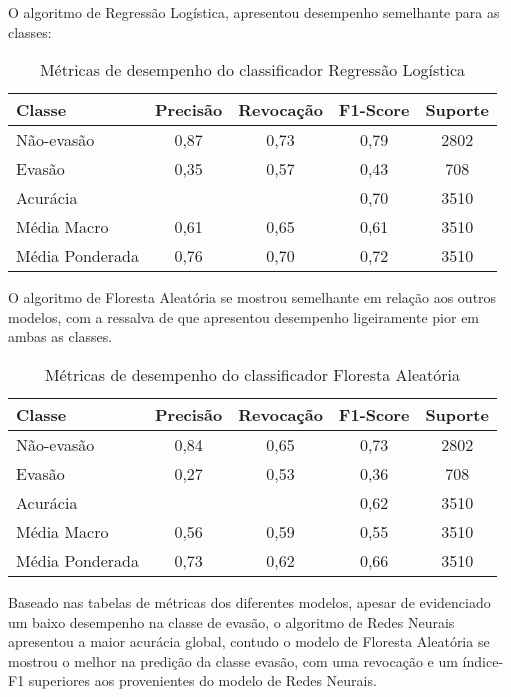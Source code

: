 \documentclass[english, spanish, brazilian]{RBIEarticle} %
\begin{document}
O algoritmo de Regressão Logística, apresentou desempenho semelhante para as classes:

\vspace{0.5cm}
\begin{table}[htbp]
\centering
\label{tab:metricas}
\begin{tabular}{lcccc}
\hline
Classe        & Precisão & Revocação & F1-Score & Suporte \\ \hline
Não-evasão           & 0,87     & 0,73      & 0,79     & 2802    \\
Evasão           & 0,35     & 0,57      & 0,43     & 708     \\ \hline
Acurácia      &          &           & 0,70     & 3510    \\
Média Macro   & 0,61     & 0,65      & 0,61     & 3510    \\
Média Ponderada & 0,76   & 0,70      & 0,72     & 3510    \\ \hline
\end{tabular}
\caption{Métricas de desempenho do classificador Regressão Logística}
\end{table}
\vspace{0.5cm}

O algoritmo de Floresta Aleatória se mostrou semelhante em relação aos outros modelos, com a ressalva de que apresentou desempenho ligeiramente pior em ambas as classes.

\vspace{0.5cm}
\begin{table}[htbp]
\centering
\label{tab:metricas2}
\begin{tabular}{lcccc}
\hline
Classe        & Precisão & Revocação & F1-Score & Suporte \\ \hline
Não-evasão           & 0,84     & 0,65      & 0,73     & 2802    \\
Evasão           & 0,27     & 0,53      & 0,36     & 708     \\ \hline
Acurácia      &          &           & 0,62     & 3510    \\
Média Macro   & 0,56     & 0,59      & 0,55     & 3510    \\
Média Ponderada & 0,73   & 0,62      & 0,66     & 3510    \\ \hline
\end{tabular}
\caption{Métricas de desempenho do classificador Floresta Aleatória}
\end{table}
\vspace{0.5cm}

Baseado nas tabelas de métricas dos diferentes modelos, apesar de evidenciado um baixo desempenho na classe de evasão, o algoritmo de Redes Neurais apresentou a maior acurácia global, contudo o modelo de Floresta Aleatória se mostrou o melhor na predição da classe evasão, com uma revocação e um índice-F1 superiores aos provenientes do modelo de Redes Neurais.
\end{document}
